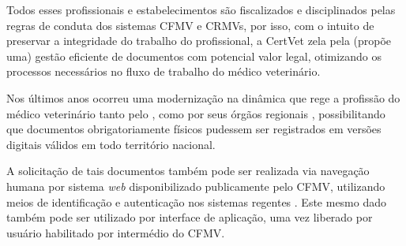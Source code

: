 \documentclass[
    12pt,               %
    openright,          %
    oneside,
    a4paper,            %
    BIBLATEX,           %
    TODO,               %
    english,            %
    brazil              %
    ]{ifsp-spo-inf-ctds}
\providecommand{\DIFaddend}{} %
\DeclareRobustCommand{\DIFaddend}{\DIFOaddend \let\includegraphics\DIFOincludegraphics} %
\begin{document}
    



    \DIFaddend Todos esses profissionais e estabelecimentos são fiscalizados e disciplinados pelas regras de conduta dos sistemas CFMV e CRMVs, por isso, com o intuito de preservar a integridade do trabalho do profissional, a CertVet zela pela (propõe uma) gestão eficiente de documentos com potencial valor legal, otimizando os processos necessários no fluxo de trabalho do médico veterinário.

    Nos últimos anos ocorreu uma modernização na dinâmica que rege a profissão do médico veterinário tanto pelo , como por seus órgãos regionais , possibilitando que documentos obrigatoriamente físicos pudessem ser registrados em versões digitais válidos em todo território nacional.

    A solicitação de tais documentos também pode ser realizada via navegação humana por sistema \emph{web} disponibilizado publicamente pelo CFMV, utilizando meios de identificação e autenticação nos sistemas regentes . Este mesmo dado também pode ser utilizado por interface de aplicação, uma vez liberado por usuário habilitado por intermédio do CFMV.
\end{document}
